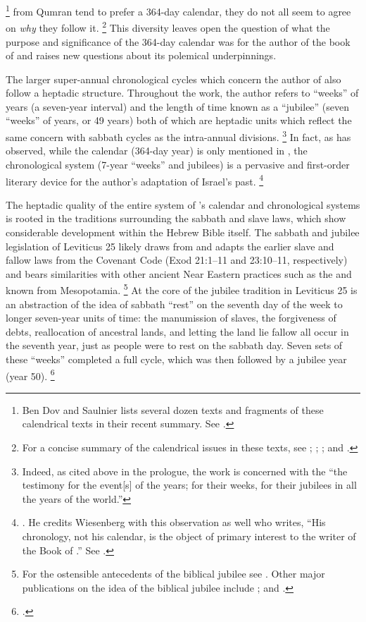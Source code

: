     \footnote{Ben Dov and Saulnier lists several dozen texts and fragments of these calendrical texts in their recent summary. See \cite[132--133]{bendov-saulnier_cbr2008}.}
from Qumran tend to prefer a 364-day calendar, they do not all seem to agree on \emph{why} they follow it.%
    \footnote{For a concise summary of the calendrical issues in these texts, see 
        \cite{vanderkam1998};
        \cite[233--268]{glessmer_flint-vanderkam1999};
        \cite[127--135]{bendov-saulnier_cbr2008}; and 
        \cite{jacobus_brooke-hempel2018}.}
This diversity leaves open the question of what the purpose and significance of the 364-day calendar was for the author of the book of \jub and raises new questions about its polemical underpinnings.

The larger super-annual chronological cycles which concern the author of \jub also follow a heptadic structure. Throughout the work, the author refers to ``weeks'' of years (a seven-year interval) and the length of time known as a ``jubilee'' (seven ``weeks'' of years, or 49 years) both of which are heptadic units which reflect the same concern with sabbath cycles as the intra-annual divisions.%
    \footnote{Indeed, as cited above in the prologue, the work is concerned with the ``the testimony for the event[s] of the years; for their weeks, for their jubilees in all the years of the world.''}
In fact, as \vanderkam has observed, while the calendar (364-day year) is only mentioned in , the chronological system (7-year ``weeks'' and jubilees) is a pervasive and first-order literary device for the author's adaptation of Israel's past.%
    \footnote{\Cite[522]{vanderkam-b_vanderkam2000}. He credits Wiesenberg with this observation as well who writes, ``His chronology, not his calendar, is the object of primary interest to the writer of the Book of \jub.'' See \cite[4]{wiesenberg_rev-qumran1961}.}

The heptadic quality of the entire system of \jub's calendar and chronological systems is rooted in the traditions surrounding the sabbath and slave laws, which show considerable development within the Hebrew Bible itself. The sabbath and jubilee legislation of Leviticus 25 likely draws from and adapts the earlier slave and fallow laws from the Covenant Code (Exod 21:1--11 and 23:10--11, respectively) and bears similarities with other ancient Near Eastern practices such as the  and  known from Mesopotamia.%
    \footnote{For the ostensible antecedents of the biblical jubilee see \cite[1--51]{bergsma2007}. Other major publications on the idea of the biblical jubilee include 
        \cite{north1954};
        \cite{fager1993} and 
        \cite{lefebvre2003}.}
At the core of the jubilee tradition in Leviticus 25 is an abstraction of the idea of sabbath ``rest'' on the seventh day of the week to longer seven-year units of time: the manumission of slaves, the forgiveness of debts, reallocation of ancestral lands, and letting the land lie fallow all occur in the seventh year, just as people were to rest on the sabbath day. Seven sets of these ``weeks'' completed a full cycle, which was then followed by a jubilee year (year 50).%
    \footnote{\Cite[85--92]{bergsma2007}.}

